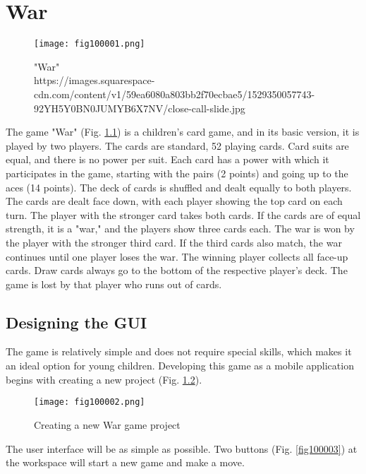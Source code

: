 \chapter{War}

\begin{figure}[H]
   \centering
   \texttt{[image: fig100001.png]}
   \caption{"War" \\ https://images.squarespace-cdn.com/content/v1/59ea6080a803bb2f70ecbae5/1529350057743-92YH5Y0BN0JUMYB6X7NV/close-call-slide.jpg}
\label{fig100001}
\end{figure}

The game "War" (Fig. \ref{fig100001}) is a children's card game, and in its basic version, it is played by two players. The cards are standard, 52 playing cards. Card suits are equal, and there is no power per suit. Each card has a power with which it participates in the game, starting with the pairs (2 points) and going up to the aces (14 points). The deck of cards is shuffled and dealt equally to both players. The cards are dealt face down, with each player showing the top card on each turn. The player with the stronger card takes both cards. If the cards are of equal strength, it is a "war," and the players show three cards each. The war is won by the player with the stronger third card. If the third cards also match, the war continues until one player loses the war. The winning player collects all face-up cards. Draw cards always go to the bottom of the respective player's deck. The game is lost by that player who runs out of cards.

\section{Designing the GUI}

The game is relatively simple and does not require special skills, which makes it an ideal option for young children. Developing this game as a mobile application begins with creating a new project (Fig. \ref{fig100002}).

\begin{figure}[H]
   \centering
   \texttt{[image: fig100002.png]}
   \caption{Creating a new War game project}
\label{fig100002}
\end{figure}

The user interface will be as simple as possible. Two buttons (Fig. \ref{fig100003}) at the workspace will start a new game and make a move.

